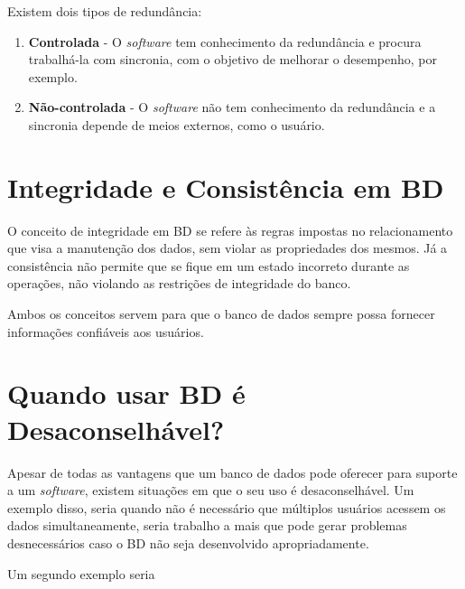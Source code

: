 \documentclass[12pt]{article}
\begin{document}
Existem dois tipos de redundância:
\begin{enumerate}
    \item \textbf{Controlada} - O \textit{software} tem conhecimento da redundância e procura trabalhá-la com sincronia, com o objetivo de melhorar o desempenho, por exemplo.
    \item \textbf{Não-controlada} - O \textit{software} não tem conhecimento da redundância e a sincronia depende de meios externos, como o usuário.
\end{enumerate}

\section{Integridade e Consistência em BD}
O conceito de integridade em BD se refere às regras impostas no relacionamento que visa a manutenção dos dados, sem violar as propriedades dos mesmos. Já a consistência não permite que se fique em um estado incorreto durante as operações, não violando as restrições de integridade do banco.

Ambos os conceitos servem para que o banco de dados sempre possa fornecer informações confiáveis aos usuários.

\section{Quando usar BD é Desaconselhável?}
Apesar de todas as vantagens que um banco de dados pode oferecer para suporte a um \textit{software}, existem situações em que o seu uso é desaconselhável.
Um exemplo disso, seria quando não é necessário que múltiplos usuários acessem os dados simultaneamente, seria trabalho a mais que pode gerar problemas desnecessários caso o BD não seja desenvolvido apropriadamente.

Um segundo exemplo seria 
\end{document}
